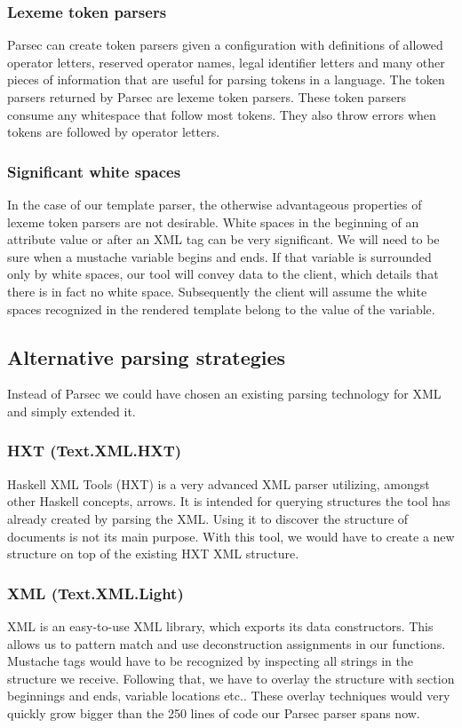 \subsubsection{Lexeme token parsers}
Parsec can create token parsers given a configuration with definitions of
allowed operator letters, reserved operator names,
legal identifier letters and many other pieces of information
that are useful for parsing tokens in a language.
The token parsers returned by Parsec are lexeme token parsers.
These token parsers consume any whitespace that follow most tokens.
They also throw errors when tokens are followed by operator letters.

\subsubsection{Significant white spaces}
In the case of our template parser, the otherwise advantageous properties
of lexeme token parsers are not desirable.
White spaces in the beginning of an attribute value or after an XML tag can be
very significant.
We will need to be sure when a mustache variable begins and ends.
If that variable is surrounded only by white spaces, our tool will convey
data to the client, which details that there is in fact no white space.
Subsequently the client will assume the white spaces recognized in the
rendered template belong to the value of the variable.

\subsection{Alternative parsing strategies}
Instead of Parsec we could have chosen an existing parsing technology for XML
and simply extended it.

\subsubsection{HXT (Text.XML.HXT)}
Haskell XML Tools (HXT) is a very advanced XML parser utilizing, amongst other
Haskell concepts, arrows. It is intended for querying structures the
tool has already created by parsing the XML. Using it to discover the structure
of documents is not its main purpose. With this tool, we would have to create a
new structure on top of the existing HXT XML structure.

\subsubsection{XML (Text.XML.Light)}
XML is an easy-to-use XML library, which exports its data constructors.
This allows us to pattern match and use deconstruction assignments in our
functions.
Mustache tags would have to be recognized by inspecting all strings in the
structure we receive. Following that, we have to overlay the structure with
section beginnings and ends, variable locations etc.. These overlay techniques
would very quickly grow bigger than the 250 lines of code our Parsec parser
spans now.

